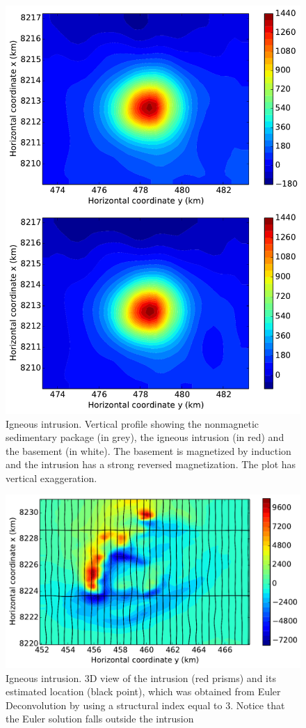 \documentclass[journal abbreviation, npg]{copernicus}
\begin{document}
\begin{figure}[t]
\includegraphics[width=120mm]{Figures/npgd-2014-0069-f10}
\caption{Igneous intrusion. Vertical profile showing the 
nonmagnetic sedimentary package (in grey), the igneous intrusion
(in red) and the basement (in white). The basement is magnetized by 
induction and the intrusion has a strong reversed magnetization. The
plot has vertical exaggeration.}
\label{fig:intrusion-profile}
\end{figure}

\begin{figure}[t]
\includegraphics[width=120mm]{Figures/npgd-2014-0069-f11}
\caption{Igneous intrusion. 3D view of the intrusion (red prisms)
and its estimated location (black point), which was obtained from
Euler Deconvolution by using a structural index equal to 3. Notice 
that the Euler solution falls outside the intrusion}
\label{fig:intrusion-euler}
\end{figure}
\end{document}

